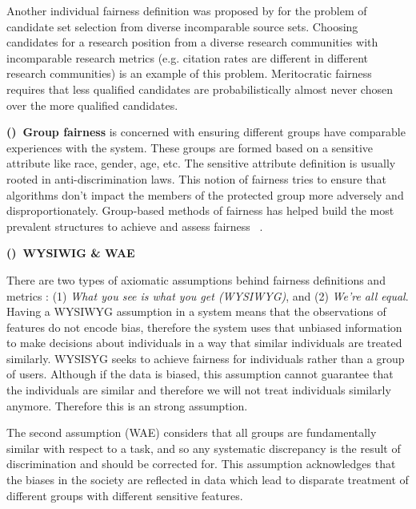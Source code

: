         Another individual fairness definition was proposed by \cite{pmlr-v70-kearns17a} for the problem of candidate set selection from diverse incomparable source sets. Choosing candidates for a research position from a diverse research communities with incomparable research metrics (e.g. citation rates are different in different research communities) is an example of this problem. Meritocratic fairness requires that less qualified candidates are probabilistically almost never chosen over the more qualified candidates.
        
        \textbf{()~Group fairness} is concerned with ensuring different groups have comparable experiences with the system. These groups are formed based on a sensitive attribute like race, gender, age, etc. The sensitive attribute definition is usually rooted in anti-discrimination laws\cite{barocas2016big}. This notion of fairness tries to ensure that algorithms don't impact the members of the protected group more adversely and disproportionately. Group-based methods of fairness has helped build the most prevalent structures to achieve and assess fairness ~\cite{zemel2013learning,kamishima2012fairness,kamiran2010discrimination,zhang2017anti}.
        
        \textbf{()~WYSIWIG \& WAE}
        
        There are two types of axiomatic assumptions behind fairness definitions and metrics \cite{friedler-impossibility-2021}: (1) \textit{What you see is what you get (WYSIWYG)}, and (2) \textit{We're all equal}. Having a WYSIWYG assumption in a system means that the observations of features do not encode bias, therefore the system uses that unbiased information to make decisions about individuals in a way that similar individuals are treated similarly. WYSISYG seeks to achieve fairness for individuals rather than a group of users. Although if the data is biased, this assumption cannot guarantee that the individuals are similar and therefore we will not treat individuals similarly anymore. Therefore this is an strong assumption. 
        
        The second assumption (WAE) considers that all groups are fundamentally similar with respect to a task, and so any systematic discrepancy is the result of discrimination and should be corrected for. This assumption acknowledges that the biases in the society are reflected in data which lead to disparate treatment of different groups with different sensitive features.
        
